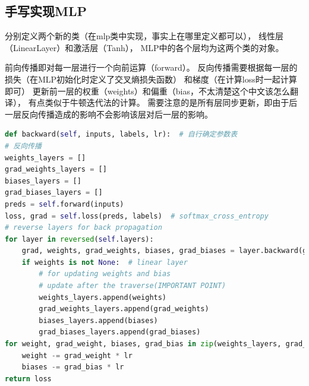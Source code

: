\documentclass[UTF8]{article}
\begin{document}
    \subsection{手写实现MLP}
    分别定义两个新的类（在mlp类中实现，事实上在哪里定义都可以），
    线性层（{\jetbrains LinearLayer}）和激活层（{\jetbrains Tanh}），
    MLP中的各个层均为这两个类的对象。

    前向传播即对每一层进行一个向前运算（{\jetbrains forward}）。
    反向传播需要根据每一层的损失（在MLP初始化时定义了交叉熵损失函数）
    和梯度（在计算loss时一起计算即可）
    更新前一层的权重（weights）和偏重（bias，不太清楚这个中文该怎么翻译），
    有点类似于牛顿迭代法的计算。
    需要注意的是所有层同步更新，即由于后一层反向传播造成的影响不会影响该层对后一层的影响。
    \begin{lstlisting}[language=python]
def backward(self, inputs, labels, lr):  # 自行确定参数表
# 反向传播
weights_layers = []
grad_weights_layers = []
biases_layers = []
grad_biases_layers = []
preds = self.forward(inputs)
loss, grad = self.loss(preds, labels)  # softmax_cross_entropy
# reverse layers for back propagation
for layer in reversed(self.layers):
    grad, weights, grad_weights, biases, grad_biases = layer.backward(grad)
    if weights is not None:  # linear layer
        # for updating weights and bias
        # update after the traverse(IMPORTANT POINT)
        weights_layers.append(weights)
        grad_weights_layers.append(grad_weights)
        biases_layers.append(biases)
        grad_biases_layers.append(grad_biases)
for weight, grad_weight, biases, grad_bias in zip(weights_layers, grad_weights_layers, biases_layers, grad_biases_layers):
    weight -= grad_weight * lr
    biases -= grad_bias * lr
return loss
    \end{lstlisting}
\end{document}
